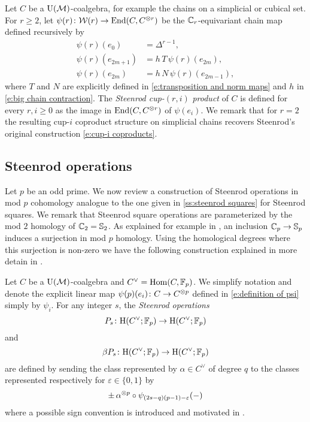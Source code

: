 Let $C$ be a $\operatorname{\mathrm{U}(\mathcal{M})}$-coalgebra, for example the chains on a simplicial or cubical set.
For $r \geq 2$, let $\psi(r) \colon \mathcal{W}(r) \to \mathrm{End}(C, C^{\otimes r})$ be the $\mathbb{C}_r$-equivariant chain map defined recursively by
\begin{equation}\label{e:definition of psi}
\begin{split}
\psi(r)(e_0) & = \Delta^{r-1}, \\
\psi(r)(e_{2m+1}) & = h\,T\,\psi(r)(e_{2m}), \\
\psi(r)(e_{2m}) & = h\,N\,\psi(r)(e_{2m-1}),
\end{split}
\end{equation}
where $T$ and $N$ are explicitly defined in \eqref{e:transposition and norm maps} and $h$ in \eqref{e:big chain contraction}.
The \textit{Steenrod cup-}$(r, i)$ \textit{product} of $C$ is defined for every $r, i \geq 0$ as the image in $\mathrm{End}(C, C^{\otimes r})$ of $\psi(e_i)$.
We remark that for $r = 2$ the resulting cup-$i$ coproduct structure on simplicial chains recovers Steenrod's original construction \eqref{e:cup-i coproducts}.

\subsection{Steenrod operations} \label{ss:steenrod operations}

Let $p$ be an odd prime.
We now review a construction of Steenrod operations in mod $p$ cohomology analogue to the one given in \cref{ss:steenrod squares} for Steenrod squares.
We remark that Steenrod square operations are parameterized by the mod $2$ homology of $\mathbb{C}_2 = \mathbb{S}_2$.
As explained for example in \cite[Corollary~VI.1.4]{adem2004milgram}, an inclusion $\mathbb{C}_p \to \mathbb{S}_p$ induces a surjection in mod $p$ homology.
Using the homological degrees where this surjection is non-zero we have the following construction explained in more detain in \cite{steenrod1952reduced, steenrod1953cyclic, steenrod1962cohomology, may1970general}.

Let $C$ be a $\operatorname{\mathrm{U}(\mathcal{M})}$-coalgebra and $C^\vee = \mathrm{Hom}(C, {\mathbb{F}_p})$.
We simplify notation and denote the explicit linear map $\psi(p)(e_i) \colon C \to C^{\otimes p}$ defined in \eqref{e:definition of psi} simply by $\psi_i$.
For any integer $s$, the \textit{Steenrod operations}
\begin{equation*}
P_s \colon \mathrm{H}(C^\vee; {\mathbb{F}_p}) \to \mathrm{H}(C^\vee; {\mathbb{F}_p})
\end{equation*}
and
\begin{equation*}
\beta P_s \colon \mathrm{H}(C^\vee; {\mathbb{F}_p}) \to \mathrm{H}(C^\vee; {\mathbb{F}_p})
\end{equation*}
are defined by sending the class represented by $\alpha \in C^\vee$ of degree $q$ to the classes represented respectively for $\varepsilon \in \{0,1\}$ by
\begin{equation*}
\pm \, \alpha^{\otimes p} \circ \psi_{(2s-q)(p-1)-\varepsilon}(-)
\end{equation*}
where a possible sign convention is introduced and motivated in \cite[(6.1)]{steenrod1953cyclic}.

